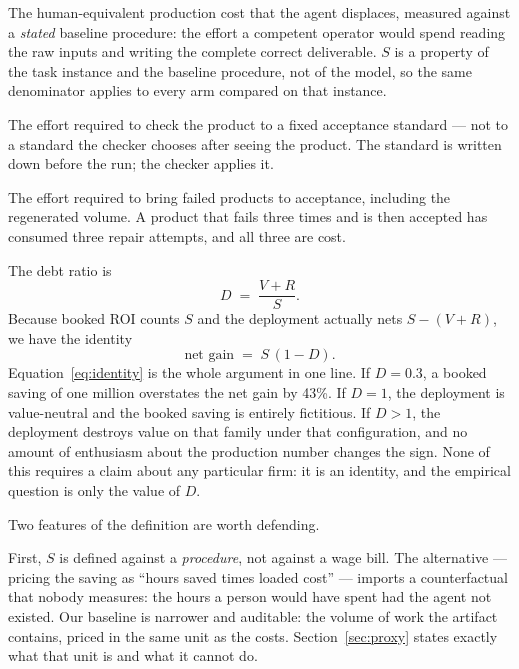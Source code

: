 \documentclass[11pt]{article}
\newcommand{\D}{\ensuremath{D}}
\newcommand{\SV}{\ensuremath{S}}
\newcommand{\VV}{\ensuremath{V}}
\newcommand{\RV}{\ensuremath{R}}
\begin{document}
\begin{description}[leftmargin=1.4em,style=nextline,itemsep=3pt]
\item[Gross production saving $\SV$.] The human-equivalent production cost that the agent
displaces, measured against a \emph{stated} baseline procedure: the effort a competent operator
would spend reading the raw inputs and writing the complete correct deliverable. $\SV$ is a
property of the task instance and the baseline procedure, not of the model, so the same
denominator applies to every arm compared on that instance.
\item[Verification cost $\VV$.] The effort required to check the product to a fixed acceptance
standard --- not to a standard the checker chooses after seeing the product. The standard is
written down before the run; the checker applies it.
\item[Rework cost $\RV$.] The effort required to bring failed products to acceptance, including
the regenerated volume. A product that fails three times and is then accepted has consumed three
repair attempts, and all three are cost.
\end{description}

The debt ratio is
\begin{equation}
\D \;=\; \frac{\VV+\RV}{\SV}.
\label{eq:debt}
\end{equation}
Because booked ROI counts $\SV$ and the deployment actually nets $\SV-(\VV+\RV)$, we have the
identity
\begin{equation}
\text{net gain} \;=\; \SV\,(1-\D).
\label{eq:identity}
\end{equation}
Equation~\eqref{eq:identity} is the whole argument in one line. If $\D=0.3$, a booked saving of
one million overstates the net gain by 43\%. If $\D=1$, the deployment is value-neutral and the
booked saving is entirely fictitious. If $\D>1$, the deployment destroys value on that family
under that configuration, and no amount of enthusiasm about the production number changes the
sign. None of this requires a claim about any particular firm: it is an identity, and the
empirical question is only the value of $\D$.

Two features of the definition are worth defending.

First, $\SV$ is defined against a \emph{procedure}, not against a wage bill. The alternative ---
pricing the saving as ``hours saved times loaded cost'' --- imports a counterfactual that nobody
measures: the hours a person would have spent had the agent not existed. Our baseline is
narrower and auditable: the volume of work the artifact contains, priced in the same unit as the
costs. Section~\ref{sec:proxy} states exactly what that unit is and what it cannot do.
\end{document}
